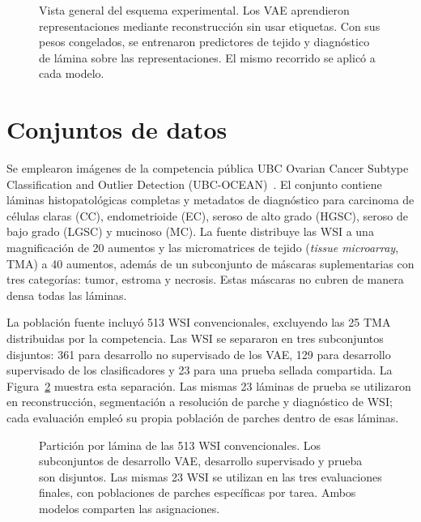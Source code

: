 \begin{figure}[p]
    \centering
    \begingroup{}
    \resizebox{\textwidth}{!}{}
    \endgroup
    \caption[Vista general del esquema experimental.]{Vista general del
    esquema experimental. Los VAE aprendieron representaciones mediante
    reconstrucción sin usar etiquetas. Con sus pesos congelados, se entrenaron
    predictores de tejido y diagnóstico de lámina sobre las representaciones.
    El mismo recorrido se aplicó a cada modelo.}
    \label{fig:esquema-general-experimento}
\end{figure}
\clearpage

\section{Conjuntos de datos}

Se emplearon imágenes de la competencia pública UBC Ovarian Cancer Subtype
Classification and Outlier Detection
(UBC-OCEAN)~\cite{ubc_ocean_2023}. El
conjunto contiene láminas histopatológicas completas y metadatos de diagnóstico
para carcinoma de células claras (CC), endometrioide (EC), seroso de alto grado
(HGSC), seroso de bajo grado (LGSC) y mucinoso (MC). La fuente distribuye las
WSI a una magnificación de 20 aumentos y las micromatrices de tejido
(\emph{tissue microarray}, TMA) a 40 aumentos, además de un
subconjunto de máscaras suplementarias con tres categorías: tumor, estroma y
necrosis. Estas máscaras no cubren de manera densa todas las láminas.

La población fuente incluyó 513 WSI convencionales, excluyendo las 25 TMA
distribuidas por la competencia. Las WSI se separaron en tres subconjuntos
disjuntos: 361 para desarrollo no supervisado de los VAE, 129 para desarrollo
supervisado de los clasificadores y 23 para una prueba sellada compartida.
La Figura~\ref{fig:particion-compartida-wsi} muestra esta separación. Las
mismas 23 láminas de prueba se utilizaron en reconstrucción, segmentación a
resolución de parche y diagnóstico de WSI; cada evaluación empleó su propia
población de parches dentro de esas láminas.

\begin{figure}[htbp]
    \centering
    
    \caption[Partición de las 513 WSI y prueba compartida.]{Partición por
    lámina de las 513 WSI convencionales. Los subconjuntos de desarrollo VAE,
    desarrollo supervisado y prueba son disjuntos. Las mismas 23 WSI se
    utilizan en las tres evaluaciones finales, con poblaciones de parches
    específicas por tarea. Ambos modelos comparten las asignaciones.}
    \label{fig:particion-compartida-wsi}
\end{figure}

